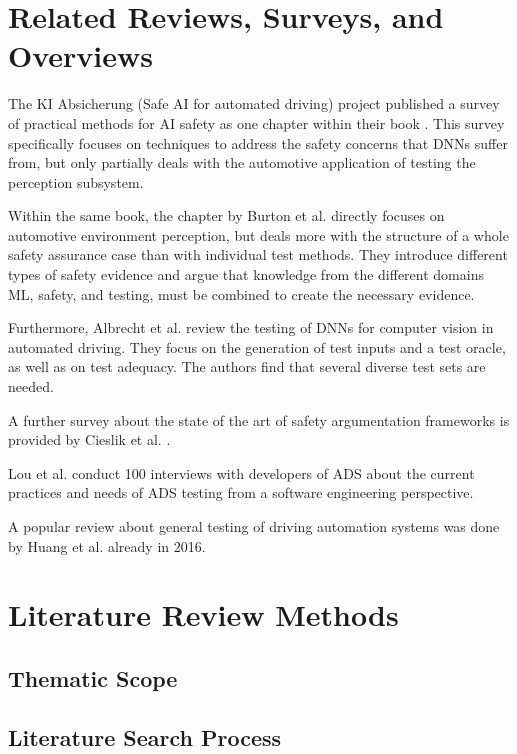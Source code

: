 \documentclass[conference]{IEEEtran}
\begin{document}
\section{Related Reviews, Surveys, and Overviews}
\label{sec:related_work}

The KI Absicherung (Safe AI for automated driving) project published a survey of practical methods for AI safety as one chapter within their book \cite{Houben2022inspect}.
This survey specifically focuses on techniques to address the safety concerns that DNNs suffer from, but only partially deals with the automotive application of testing the perception subsystem. 

Within the same book, the chapter by Burton et al. \cite{Burton2022safety} directly focuses on automotive environment perception, but deals more with the structure of a whole safety assurance case than with individual test methods. 
They introduce different types of safety evidence and argue that knowledge from the different domains ML, safety, and testing, must be combined to create the necessary evidence. 

Furthermore, Albrecht et al. \cite{Abrecht2021testing} review the testing of DNNs for computer vision in automated driving. 
They focus on the generation of test inputs and a test oracle, as well as on test adequacy. 
The authors find that several diverse test sets are needed. 

A further survey about the state of the art of safety argumentation frameworks is provided by Cieslik et al. \cite{Cieslik2022argumentation}.

Lou et al. \cite{Lou2022testing} conduct 100 interviews with developers of ADS about the current practices and needs of ADS testing from a software engineering perspective. 

A popular review about general testing of driving automation systems was done by Huang et al. \cite{Huang2016review} already in 2016.

\section{Literature Review Methods}
\label{sec:methods}


\subsection{Thematic Scope}
\subsection{Literature Search Process}
\end{document}
